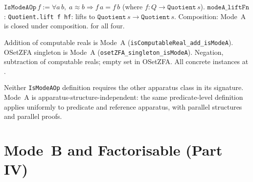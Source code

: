\begin{definition}
\label{def:IsModeAOp_ref}
\leanok
{}
$\texttt{IsModeAOp}\,f := \forall a\,b,\; a \approx b \Rightarrow
f\,a = f\,b$ (where $f : Q \to \texttt{Quotient}\,s$).
$\texttt{modeA\_liftFn}$: \texttt{Quotient.lift~f~hf}: lifts to
$\texttt{Quotient}\,s \to \texttt{Quotient}\,s$.
Composition: Mode~A is closed under composition.
\axiomprofile{[]} for all four.
\end{definition}

\begin{theorem}
\label{thm:modeA_instances}
\leanok
{}
Addition of computable reals is Mode~A (\texttt{isComputableReal\_add\_isModeA}).
OSetZFA singleton is Mode~A (\texttt{osetZFA\_singleton\_isModeA}).
Negation, subtraction of computable reals; empty set in OSetZFA.
All concrete instances at .
\end{theorem}

\begin{remark}
\label{rem:modeA_independence}
\leanok
{}
Neither \texttt{IsModeAOp} definition requires the other apparatus
class in its signature.  Mode~A is apparatus-structure-independent:
the same predicate-level definition applies uniformly to predicate and
reference apparatus, with parallel structures and parallel proofs.
\end{remark}

\section{Mode~B and Factorisable (Part IV)}
\label{sec:apparatus_modeb}

